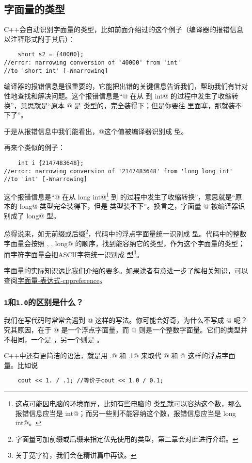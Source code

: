 \subsection*{字面量的类型}
C++会自动识别字面量的类型，比如前面介绍过的这个例子（编译器的报错信息以注释形式附于其后）：
\begin{lstlisting}
    short s2 = {40000};
//error: narrowing conversion of '40000' from 'int'
//to 'short int' [-Wnarrowing]
\end{lstlisting}
编译器的报错信息是很重要的，它能把出错的关键信息告诉我们，帮助我们有针对性地查找和解决问题。这个报错信息是``@ 在从 \lstinline@int@ 到 \lstinline@short int@ 的过程中发生了收缩转换''，意思就是``原本 @ 是 \lstinline@int@ 类型的，完全装得下；但是你要往 \lstinline@short@ 里面塞，那就装不下了''。\par
于是从报错信息中我们能看出，@这个值被编译器识别成 \lstinline@int@ 型。\par
再来个类似的例子：
\begin{lstlisting}
    int i {2147483648};
//error: narrowing conversion of '2147483648' from 'long long int'
//to 'int' [-Wnarrowing]
\end{lstlisting}
这个报错信息是``@ 在从 \lstinline@long long int@\footnote{这点可能因电脑的环境而异，比如有些电脑的 \lstinline@long@ 类型就可以容纳这个数，那么报错信息应当是 \lstinline@long int@；而另一些则不能容纳这个数，报错信息应当是 \lstinline@long long int@。} 到 \lstinline@int@ 的过程中发生了收缩转换''，意思就是``原本的 \lstinline@long long@ 类型完全装得下，但是 \lstinline@int@ 类型装不下''。换言之，字面量 @ 被编译器识别成了 \lstinline@long long@ 型。\par
总得说来，如无前缀或后缀\footnote{字面量可加前缀或后缀来指定优先使用的类型，第二章会对此进行介绍。}，代码中的浮点字面量统一识别成 \lstinline@double@ 型。代码中的整数字面量会按照 \lstinline@int@, \lstinline@long@, \lstinline@long long@ 的顺序，找到能容纳它的类型，作为这个字面量的类型；而字符字面量会把ASCII字符统一识别成 \lstinline@char@ 型\footnote{关于宽字符，我们会在精讲篇中再谈。}。\par
字面量的实际知识远比我们介绍的要多。如果读者有意进一步了解相关知识，可以查阅\href{https://zh.cppreference.com/w/cpp/language/expressions#.E5.AD.97.E9.9D.A2.E9.87.8F}{字面量-表达式-cppreference}。\par
\subsubsection*{\texttt{1}和\texttt{1.0}的区别是什么？}
我们在写代码时常常会遇到 @ 这样的写法。你可能会好奇，为什么不写成 @ 呢？究其原因，在于 @ 是一个浮点字面量，而 @ 则是一个整数字面量。它们的类型并不相同，一个是 \lstinline@double@，另一个则是 \lstinline@int@。\par
C++中还有更简洁的语法，就是用 .@ 和 \lstinline@.1@ 来取代 @ 和 @ 这样的浮点字面量。比如说
\begin{lstlisting}
    cout << 1. / .1; //等价于cout << 1.0 / 0.1;
\end{lstlisting}\par
